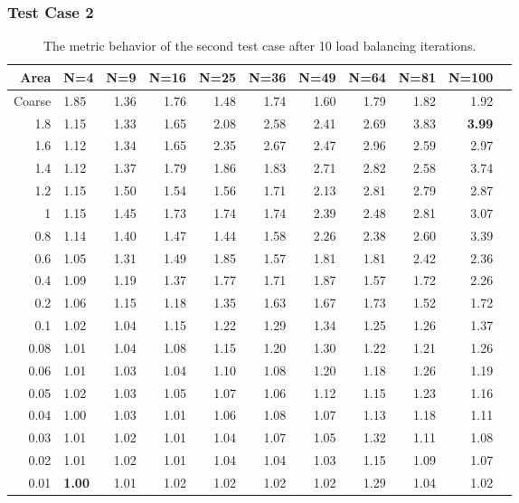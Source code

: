 \documentclass[]{beamer}
\begin{document}
\begin{frame}[t]\frametitle{Test Case 2}
\begin{table}[H]
\centering
\tiny
\caption{The metric behavior of the second test case after 10 load balancing iterations.} 
\begin{tabular}{rlrrrrrrrrr}
  \hline
 Area & N=4 & N=9 & N=16 & N=25 & N=36 & N=49 & N=64 & N=81 & N=100 \\ 
  \hline
 Coarse & 1.85 & 1.36 & 1.76 & 1.48 & 1.74 & 1.60 & 1.79 & 1.82 & 1.92 \\ 
   1.8 & 1.15 & 1.33 & 1.65 & 2.08 & 2.58 & 2.41 & 2.69 & 3.83 & \textbf{\cellcolor{blue!25}3.99} \\ 
 1.6 & 1.12 & 1.34 & 1.65 & 2.35 & 2.67 & 2.47 & 2.96 & 2.59 & 2.97 \\ 
1.4 & 1.12 & 1.37 & 1.79 & 1.86 & 1.83 & 2.71 & 2.82 & 2.58 & 3.74 \\ 
 1.2 & 1.15 & 1.50 & 1.54 & 1.56 & 1.71 & 2.13 & 2.81 & 2.79 & 2.87 \\ 
 1 & 1.15 & 1.45 & 1.73 & 1.74 & 1.74 & 2.39 & 2.48 & 2.81 & 3.07 \\ 
0.8 & 1.14 & 1.40 & 1.47 & 1.44 & 1.58 & 2.26 & 2.38 & 2.60 & 3.39 \\ 
 0.6 & 1.05 & 1.31 & 1.49 & 1.85 & 1.57 & 1.81 & 1.81 & 2.42 & 2.36 \\ 
 0.4 & 1.09 & 1.19 & 1.37 & 1.77 & 1.71 & 1.87 & 1.57 & 1.72 & 2.26 \\ 
 0.2 & 1.06 & 1.15 & 1.18 & 1.35 & 1.63 & 1.67 & 1.73 & 1.52 & 1.72 \\ 
 0.1 & 1.02 & 1.04 & 1.15 & 1.22 & 1.29 & 1.34 & 1.25 & 1.26 & 1.37 \\ 
   0.08 & 1.01 & 1.04 & 1.08 & 1.15 & 1.20 & 1.30 & 1.22 & 1.21 & 1.26 \\ 
0.06 & 1.01 & 1.03 & 1.04 & 1.10 & 1.08 & 1.20 & 1.18 & 1.26 & 1.19 \\ 
   0.05 & 1.02 & 1.03 & 1.05 & 1.07 & 1.06 & 1.12 & 1.15 & 1.23 & 1.16 \\ 
  0.04 & 1.00 & 1.03 & 1.01 & 1.06 & 1.08 & 1.07 & 1.13 & 1.18 & 1.11 \\ 
 0.03 & 1.01 & 1.02 & 1.01 & 1.04 & 1.07 & 1.05 & 1.32 & 1.11 & 1.08 \\ 
  0.02 & 1.01 & 1.02 & 1.01 & 1.04 & 1.04 & 1.03 & 1.15 & 1.09 & 1.07 \\ 
 0.01 & \textbf{\cellcolor{blue!25}1.00} & 1.01 & 1.02 & 1.02 & 1.02 & 1.02 & 1.29 & 1.04 & 1.02 \\ 
   \hline
\end{tabular}
\end{table}
\end{frame}
\end{document}

